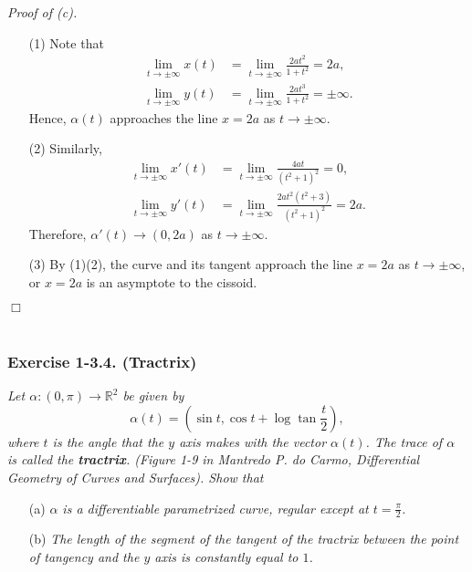 \documentclass{article}
\begin{document}
\emph{Proof of (c).}
\begin{enumerate}
\item[(1)]
  Note that
  \begin{align*}
    \lim_{t \to \pm \infty} x(t)
    &= \lim_{t \to \pm \infty} \frac{2at^2}{1+t^2}
    = 2a, \\
    \lim_{t \to \pm \infty} y(t)
    &= \lim_{t \to \pm \infty} \frac{2at^3}{1+t^2}
    = \pm \infty.
  \end{align*}
  Hence, $\alpha(t)$ approaches the line $x = 2a$ as $t \to \pm \infty$.

\item[(2)]
  Similarly,
  \begin{align*}
    \lim_{t \to \pm \infty} x'(t)
    &= \lim_{t \to \pm \infty} \frac{4at}{(t^2+1)^2}
    = 0, \\
    \lim_{t \to \pm \infty} y'(t)
    &= \lim_{t \to \pm \infty} \frac{2at^2(t^2+3)}{(t^2+1)^2}
    = 2a.
  \end{align*}
  Therefore, $\alpha'(t) \to (0,2a)$ as $t \to \pm \infty$.

\item[(3)]
  By (1)(2), the curve and its tangent approach the line $x = 2a$ as $t \to \pm \infty$,
  or $x = 2a$ is an asymptote to the cissoid.
\end{enumerate}
$\Box$ \\\\






\subsubsection*{Exercise 1-3.4. (Tractrix)}
\emph{Let $\alpha: (0, \pi) \to \mathbb{R}^2$ be given by
$$\alpha(t) = \left(\sin t, \cos t + \log\tan\frac{t}{2}\right),$$
where $t$ is the angle that the $y$ axis makes with the vector $\alpha(t)$.
The trace of $\alpha$ is called the \textbf{tractrix}.
(Figure 1-9 in Mantredo P. do Carmo, Differential Geometry of Curves and Surfaces).
Show that}
\begin{enumerate}
\item[(a)]
  \emph{$\alpha$ is a differentiable parametrized curve,
  regular except at $t = \frac{\pi}{2}$.}

\item[(b)]
  \emph{The length of the segment of the tangent of the tractrix between
  the point of tangency and the $y$ axis is constantly equal to $1$.} \\
\end{enumerate}
\end{document}
